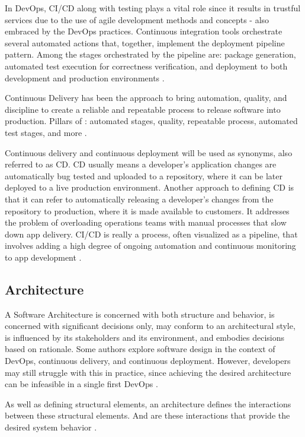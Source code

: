 In DevOps, CI/CD along with testing plays a vital role since it results in
trustful services due to the use of agile development methods and concepts -
also embraced by the DevOps practices. Continuous integration tools orchestrate
several automated actions that, together, implement the deployment pipeline
pattern. Among the stages orchestrated by the pipeline are: package generation,
automated test execution for correctness verification, and deployment to both
development and production environments \cite{rocha2019}.

Continuous Delivery has been the approach to bring automation, quality, and
discipline to create a reliable and repeatable process to release software into
production. Pillars of \devops: automated stages, quality, repeatable process,
automated test stages, and more \cite{fowler2019}.

Continuous delivery and continuous deployment will be used as synonyms, also
referred to as CD. CD usually means a developer's application changes are
automatically bug tested and uploaded to a repository, where it can be later
deployed to a live production environment. Another approach to defining CD is
that it can refer to automatically releasing a developer's changes from the
repository to production, where it is made available to customers. It addresses
the problem of overloading operations teams with manual processes that slow down
app delivery. CI/CD is really a process, often visualized as a pipeline, that
involves adding a high degree of ongoing automation and continuous monitoring to
app development \cite{redhat}. 

\subsection{Architecture}

A Software Architecture is concerned with both structure and behavior, is
concerned with significant decisions only, may conform to an architectural
style, is influenced by its stakeholders and its environment, and embodies
decisions based on rationale. Some authors explore software design in the
context of DevOps, continuous delivery, and continuous deployment. However,
developers may still struggle with this in practice, since achieving the desired
architecture can be infeasible in a single first DevOps \cite{rocha2019}.

As well as defining structural elements, an architecture defines the
interactions between these structural elements. And are these interactions that
provide the desired system behavior \cite{eeles2006}.

